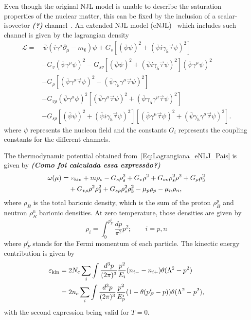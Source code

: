\documentclass[prc, reprint, amsmath, linenumbers,10pt]{revtex4-1}
\newcommand{\comment}[1]{{\bf\textit{#1}}}
\begin{document}
Even though the original NJL model is unable to describe the saturation properties of the nuclear matter, this can be fixed by the inclusion of a scalar-isovector \comment{(?)} channel~\cite{Koch1987}. An extended NJL model (eNJL)~\cite{Pais2016} which includes such channel is given by the lagrangian density
\begin{equation}\label{Eq:Lagrangiana_eNLJ_Pais}
\begin{split}
	\mathcal{L} =&~ \bar{\psi}(i\gamma^\mu\partial_\mu - m_0)\psi + G_s[(\bar{\psi}\psi)^2 + (\bar{\psi}i\gamma_5\vec{\tau}\psi)^2] \\
	& - G_v(\bar{\psi}\gamma^\mu\psi)^2 - G_{sv}[(\bar{\psi}\psi)^2 + (\bar{\psi}i\gamma_5\vec{\tau}\psi)^2](\bar{\psi}\gamma^\mu\psi)^2 \\
	& - G_\rho[(\bar{\psi}\gamma^\mu\vec{\tau}\psi)^2 + (\bar{\psi}\gamma_5\gamma^\mu\vec{\tau}\psi)^2] \\
	& - G_{v\rho}(\bar{\psi}\gamma^\mu\psi)^2[(\bar{\psi}\gamma^\mu\vec{\tau}\psi)^2 + (\bar{\psi}\gamma_5\gamma^\mu\vec{\tau}\psi)^2] \\
	& - G_{s\rho} [(\bar{\psi}\psi)^2 + (\bar{\psi}i\gamma_5\vec{\tau}\psi)^2][(\bar{\psi}\gamma^\mu\vec{\tau}\psi)^2 + (\bar{\psi}\gamma_5\gamma^\mu\vec{\tau}\psi)^2].
\end{split}
\end{equation}
%
where $\psi$ represents the nucleon field and the constants $G_i$ represents the coupling constants for the different channels.

The thermodynamic potential obtained from~\eqref{Eq:Lagrangiana_eNLJ_Pais} is given by \comment{(Como foi calculada essa expressão?)}
\begin{equation}\label{Eq:potencial_termodinamico}
\begin{split}
	\omega(\mu) =&~ \varepsilon_{\rm{kin}} + m\rho_s - G_s\rho_s^2 + G_v\rho^2 + G_{sv}\rho_s^2\rho^2 + G_\rho\rho_3^2 \\
	&+ G_{v\rho}\rho^2\rho_3^2 + G_{s\rho}\rho_s^2\rho_3^2 - \mu_p\rho_p - \mu_n\rho_n,
\end{split}
\end{equation}
%
where $\rho_B$ is the total barionic density, which is the sum of the proton $\rho_B^p$ and neutron $\rho_B^n$ barionic densities. At zero temperature, those densities are given by
\begin{equation}
	\rho_i = \int_0^{p_F^i}\frac{dp}{\pi^2}p^2; \qquad i = p,n
\end{equation}
%
where $p_F^i$ stands for the Fermi momentum of each particle. The kinectic energy contribution is given by
\begin{align}
	\varepsilon_{\rm{kin}} &= 2 N_c\sum_i \int \frac{d^3p}{(2\pi)^3}\frac{p^2}{E_i}(n_{i-}-n_{i+})\theta(\Lambda^2 - p^2) \\
	&= 2 n_c \sum_i \int \frac{d^3p}{(2\pi)^3}\frac{p^2}{E_p^i}(1 - \theta(p_F^i - p))\theta(\Lambda^2 - p^2),
\end{align}
%
with the second expression being valid for $T = 0$.
\end{document}
